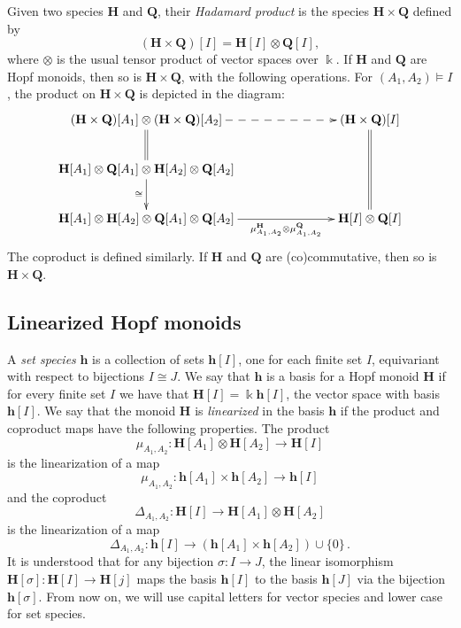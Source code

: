 \documentclass[ALCO,ThmDefs,Unicode,epreuves]{cedram}
\def\field{\Bbbk}
\newcommand{\bH}{\mathbf{H}}
\newcommand{\bh}{\mathbf{h}}
\begin{document}
Given two species $\bH$ and $\mathbf{Q}$, their \emph{Hadamard product} is the species $\bH\times\mathbf{Q}$ defined by
\[
(\bH\times\mathbf{Q})[I] = \bH[I]\otimes\mathbf{Q}[I],
\]
where $\otimes$ is the usual tensor product of vector spaces over $\field$.
If $\bH$ and $\mathbf{Q}$ are Hopf monoids, then so is $\bH\times\mathbf{Q}$, with the following operations. For $(A_1, A_2)\models I$, the product on $\bH\times\mathbf{Q}$ is depicted in the diagram:
\[
\xymatrix@C+12pt{
(\bH\times\mathbf{Q})[A_1]\otimes(\bH\times\mathbf{Q})[A_2] \ar@{=}[d] \ar@{-->}[rr] &&
 (\bH\times\mathbf{Q})[I] \ar@{=}[dd] \\
\bH[A_1]\otimes \mathbf{Q}[A_1]\otimes \bH[A_2]\otimes \mathbf{Q}[A_2]
\ar[d]_{\cong} && \\
\bH[A_1]\otimes \bH[A_2]\otimes \mathbf{Q}[A_1]\otimes \mathbf{Q}[A_2]
\ar[rr]_-{\mu_{A_1,A_2}^{\mathbf{H}}\otimes\mu_{A_1,A_2}^{\mathbf{Q}}} &&
\bH[I]\otimes\mathbf{Q}[I]
}
\]
The coproduct is defined similarly. If $\bH$ and $\mathbf{Q}$ are (co)commutative, then so is $\bH\times\mathbf{Q}$. 

\subsection{Linearized Hopf monoids}\label{ss:stronglin} A \emph{set species} $\bh$ is a collection of sets $\bh[I]$,
one for each finite set $I$, equivariant with respect to bijections $I\cong J$.
We say that $\bh$ is a basis for a Hopf monoid $\bH$ if for every finite set $I$ we have that $\bH[I]=\field \bh[I]$, the vector space with basis $\bh[I]$. We say that the monoid $\bH$ is \emph{linearized} in the basis $\bh$ if the product and coproduct maps have the following properties.
The product
\[
\mu_{A_1,A_2}: \bH[A_1] \otimes \bH[A_2] \to \bH[I] 
\]
is the linearization of a map
\begin{equation}\label{e:prod-lin}
\mu_{A_1,A_2}: \bh[A_1] \times \bh[A_2] \to \bh[I] 
\end{equation}
and the coproduct
\[
\Delta_{A_1,A_2}: \bH[I] \to \bH[A_1]\otimes\bH[A_2]
\]
is the linearization of a map
\begin{equation}\label{e:coprod-lin}
\Delta_{A_1,A_2}: \bh[I] \to (\bh[A_1]\times\bh[A_2])\cup\{0\}\,.
\end{equation}
It is understood that for any bijection $\sigma\colon I \to J$, the linear isomorphism $\bH[\sigma]\colon \bH[I]\to \bH[j]$ maps the basis $\bh[I]$ to the basis $\bh[J]$ via the bijection $\bh[\sigma]$.
From now on, we will use capital letters for vector species and lower case for set species.
\end{document}
